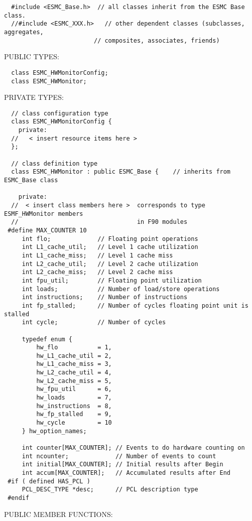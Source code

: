 \begin{verbatim}  #include <ESMC_Base.h>  // all classes inherit from the ESMC Base class.
  //#include <ESMC_XXX.h>   // other dependent classes (subclasses, aggregates,
                         // composites, associates, friends)
 \end{verbatim}{\sf PUBLIC TYPES:}
\begin{verbatim}  class ESMC_HWMonitorConfig;
  class ESMC_HWMonitor;
 \end{verbatim}{\sf PRIVATE TYPES:}
\begin{verbatim} 
  // class configuration type
  class ESMC_HWMonitorConfig {
    private:
  //   < insert resource items here >
  };
 
  // class definition type
  class ESMC_HWMonitor : public ESMC_Base {    // inherits from ESMC_Base class
 
    private:
  //  < insert class members here >  corresponds to type ESMF_HWMonitor members
  //                                 in F90 modules
 #define MAX_COUNTER 10
     int flo;             // Floating point operations
     int L1_cache_util;   // Level 1 cache utilization
     int L1_cache_miss;   // Level 1 cache miss
     int L2_cache_util;   // Level 2 cache utilization
     int L2_cache_miss;   // Level 2 cache miss
     int fpu_util;        // Floating point utilization
     int loads;           // Number of load/store operations
     int instructions;    // Number of instructions
     int fp_stalled;      // Number of cycles floating point unit is stalled
     int cycle;           // Number of cycles
 
     typedef enum {
         hw_flo           = 1,
         hw_L1_cache_util = 2,
         hw_L1_cache_miss = 3,
         hw_L2_cache_util = 4,
         hw_L2_cache_miss = 5,
         hw_fpu_util      = 6,
         hw_loads         = 7,
         hw_instructions  = 8,
         hw_fp_stalled    = 9,
         hw_cycle         = 10
     } hw_option_names;
 
     int counter[MAX_COUNTER]; // Events to do hardware counting on
     int ncounter;             // Number of events to count
     int initial[MAX_COUNTER]; // Initial results after Begin
     int accum[MAX_COUNTER];   // Accumulated results after End
 #if ( defined HAS_PCL )
     PCL_DESC_TYPE *desc;      // PCL description type
 #endif
 \end{verbatim}{\sf PUBLIC MEMBER FUNCTIONS:}
